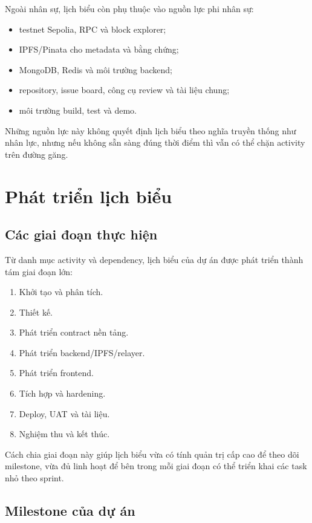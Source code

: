 Ngoài nhân sự, lịch biểu còn phụ thuộc vào nguồn lực phi nhân sự:

\begin{itemize}
  \item testnet Sepolia, RPC và block explorer;
  \item IPFS/Pinata cho metadata và bằng chứng;
  \item MongoDB, Redis và môi trường backend;
  \item repository, issue board, công cụ review và tài liệu chung;
  \item môi trường build, test và demo.
\end{itemize}

Những nguồn lực này không quyết định lịch biểu theo nghĩa truyền thống như nhân lực, nhưng nếu không sẵn sàng đúng thời điểm thì vẫn có thể chặn activity trên đường găng.

\fi
\section{Phát triển lịch biểu}

\subsection{Các giai đoạn thực hiện}

Từ danh mục activity và dependency, lịch biểu của dự án được phát triển thành tám giai đoạn lớn:

\begin{enumerate}
  \item Khởi tạo và phân tích.
  \item Thiết kế.
  \item Phát triển contract nền tảng.
  \item Phát triển backend/IPFS/relayer.
  \item Phát triển frontend.
  \item Tích hợp và hardening.
  \item Deploy, UAT và tài liệu.
  \item Nghiệm thu và kết thúc.
\end{enumerate}

Cách chia giai đoạn này giúp lịch biểu vừa có tính quản trị cấp cao để theo dõi milestone, vừa đủ linh hoạt để bên trong mỗi giai đoạn có thể triển khai các task nhỏ theo sprint.

\subsection{Milestone của dự án}


